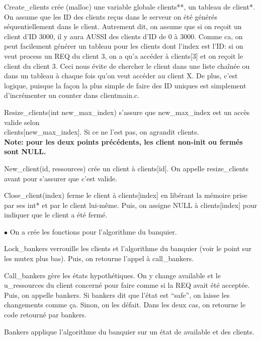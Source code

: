 \documentclass[11pt]{article}
\begin{document}
\begin{description}[font=$\circ$, labelindent=1cm]
  \item Create\_clients crée (malloc) une variable globale clients**, un tableau de client*. 
On assume que les ID des clients reçus dans le serveur on été générés séquentiellement dans le client. Autrement dit, on assume que si on reçoit un client d'ID 3000, il y aura AUSSI des clients d'ID de 0 à 3000. Comme ca, on peut facilement générer un tableau pour les clients dont l'index est l'ID: si on veut process un REQ du client 3, on a qu'a accéder à clients[3] et on reçoit le client\* du client 3. Ceci nous évite de chercher le client dans une liste chaînée ou dans un tableau à chaque fois qu'on veut accéder au client X.
De plus, c'est logique, puisque la façon la plus simple de faire des ID uniques est simplement d'incrémenter un counter dans client\/main.c.
\item Resize\_clients(int new\_max\_index) s’assure que new\_max\_index est un accès valide selon \\ clients[new\_max\_index]. Si ce ne l’est pas, on agrandit clients.\\
\textbf{Note: pour les deux points précédents, les client non-init ou fermés sont NULL.}
\item New\_client(id, ressources) crée un client à clients[id]. On appelle resize\_clients avant pour s’assurer que c’est valide.
\item Close\_client(index) ferme le client à clients[index] en libérant la mémoire prise par ses int* et par le client lui-même. Puis, on assigne NULL à clients[index] pour indiquer que le client a été fermé.
\end{description}
$\bullet$ On a crée les fonctions pour l'algorithme du banquier.
\begin{description}[font=$\circ$, labelindent=1cm]
 \item Lock\_bankers verrouille les clients et l’algorithme du banquier (voir le point sur les mutex plus bas). Puis, on retourne l’appel à call\_bankers.
 \item Call\_bankers gère les états hypothétiques. On y change available et le u\_ressources du client concerné pour faire comme si la REQ avait été acceptée. Puis, on appelle bankers. Si bankers dit que l’état est “safe”, on laisse les changements comme ça. Sinon, on les défait. Dans les deux cas, on retourne le code retourné par bankers.
 \item Bankers applique l’algorithme du banquier sur un état de available et des clients.
\end{description}
\end{document}
